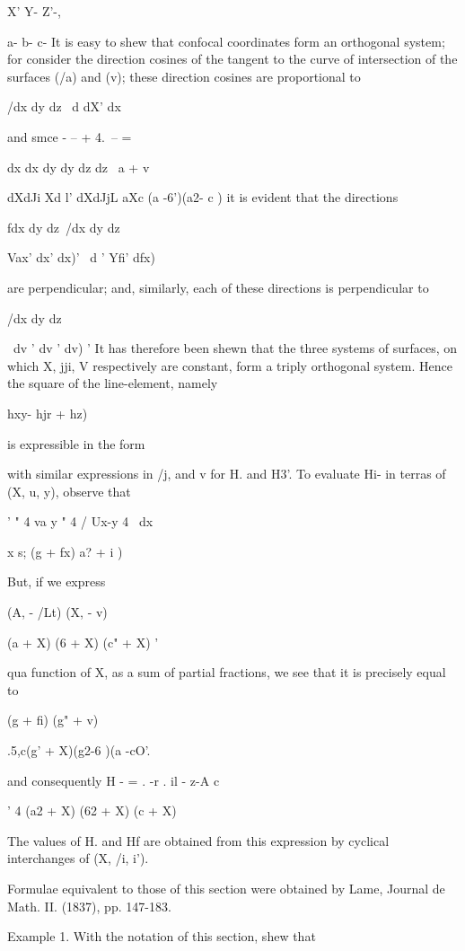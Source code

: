 {{X' Y- Z'-,

a- b- c- It is easy to shew that confocal coordinates form an
orthogonal system; for consider the direction cosines of the tangent
to the curve of intersection of the surfaces (/a) and (v); these
direction cosines are proportional to

/dx dy dz \ d dX' dx

and smce - -- + 4.\ -- = %

dx dx dy dy dz dz \ a + v

dXdJi Xd l' dXdJjL aXc (a -6')(a2- c ) it is evident that the
directions

fdx dy dz\ /dx dy dz\

Vax' dx' dx)' \ d ' Yfi' dfx)

are perpendicular; and, similarly, each of these directions is
perpendicular to

/dx dy dz\

\ dv ' dv ' dv) ' It has therefore been shewn that the three systems
of surfaces, on which X, jji, V respectively are constant, form a
triply orthogonal system. Hence the square of the line-element, namely

 hxy- hjr + hz)\

is expressible in the form

%
%

with similar expressions in /j, and v for H. and H3'. To evaluate Hi-
in terras of (X, u, y), observe that

' " 4 va y " 4 / Ux-y 4 \ dx

 x s; (g + fx) a? + i )

But, if we express

(A, - /Lt) (X, - v)

(a + X) (6 + X) (c" + X) '

qua function of X, as a sum of partial fractions, we see that it is
precisely equal to

  (g + fi) (g" + v)

 .5,c(g' + X)(g2-6 )(a -cO'.

and consequently H - = . -r . il - z-A c

  ' 4 (a2 + X) (62 + X) (c + X)

The values of H. and Hf are obtained from this expression by cyclical
interchanges of (X, /i, i').

Formulae equivalent to those of this section were obtained by Lame,
Journal de Math. II. (1837), pp. 147-183.

Example 1. With the notation of this section, shew that

}}
